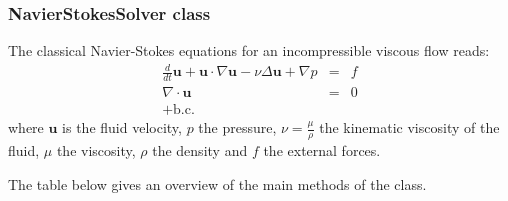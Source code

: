 \documentclass[11pt]{article}
\begin{document}
\subsubsection{NavierStokesSolver class}
The classical Navier-Stokes equations for an incompressible viscous flow reads:
\begin{eqnarray}
\frac{d}{dt}\mathbf{u}+\mathbf{u}\cdot\nabla\mathbf{u}-\nu\Delta\mathbf{u} + \nabla p & = & f \label{eqn:NS1}\\
\nabla\cdot\mathbf{u} & = & 0\label{eqn:NS2}\\
+\text{b.c.}\nonumber
\end{eqnarray}
where $\mathbf{u}$ is the fluid velocity, $p$ the pressure, $\nu=\frac{\mu}{\rho}$ the kinematic viscosity of the fluid, $\mu$ the viscosity, $\rho$ the density and $f$ the external forces.

The table below gives an overview of the main methods of the class.
\end{document}
